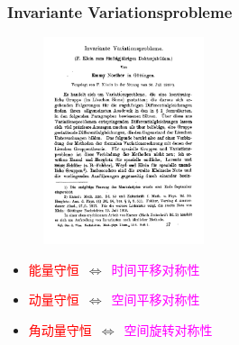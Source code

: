{\frame
{
	\frametitle{\textrm{Invariante Variationsprobleme}}
\begin{figure}[h!]
\centering
%
\vspace{-10.5pt}
\includegraphics[height=0.52\textwidth,width=0.42\textwidth,viewport=0 0 450 580,clip]{Figures/Noether_theorem-1st_page.png}
\label{Noether_theorem}
\end{figure}
\begin{itemize}
\centering
	\item \textcolor{red}{能量守恒}~$\Longleftrightarrow$~\textcolor{magenta}{时间平移对称性}
	\item \textcolor{red}{动量守恒}~$\Longleftrightarrow$~\textcolor{magenta}{空间平移对称性}
	\item \textcolor{red}{角动量守恒}~$\Longleftrightarrow$~\textcolor{magenta}{空间旋转对称性}
\end{itemize}
}

}
